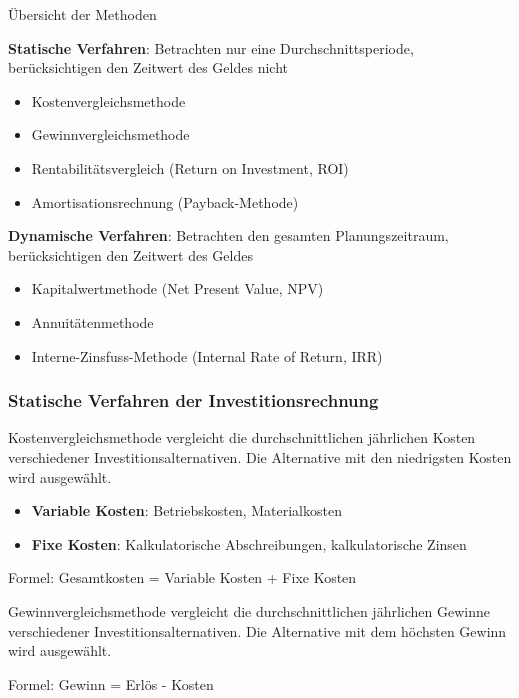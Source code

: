 \begin{definition}{Übersicht der Methoden}

    \textbf{Statische Verfahren}: Betrachten nur eine Durchschnittsperiode, berücksichtigen den Zeitwert des Geldes nicht
    \begin{itemize}
        \item Kostenvergleichsmethode
        \item Gewinnvergleichsmethode
        \item Rentabilitätsvergleich (Return on Investment, ROI)
        \item Amortisationsrechnung (Payback-Methode)
    \end{itemize}
\textbf{Dynamische Verfahren}: Betrachten den gesamten Planungszeitraum, berücksichtigen den Zeitwert des Geldes
    \begin{itemize}
        \item Kapitalwertmethode (Net Present Value, NPV)
        \item Annuitätenmethode
        \item Interne-Zinsfuss-Methode (Internal Rate of Return, IRR)
    \end{itemize}

\end{definition}

\subsubsection{Statische Verfahren der Investitionsrechnung}

\begin{definition}{Kostenvergleichsmethode}
     vergleicht die durchschnittlichen jährlichen Kosten verschiedener Investitionsalternativen. Die Alternative mit den niedrigsten Kosten wird ausgewählt.
\begin{itemize}
    \item \textbf{Variable Kosten}: Betriebskosten, Materialkosten
    \item \textbf{Fixe Kosten}: Kalkulatorische Abschreibungen, kalkulatorische Zinsen
\end{itemize}

Formel: Gesamtkosten = Variable Kosten + Fixe Kosten
\end{definition}

\begin{definition}{Gewinnvergleichsmethode}
vergleicht die durchschnittlichen jährlichen Gewinne verschiedener Investitionsalternativen. Die Alternative mit dem höchsten Gewinn wird ausgewählt.

Formel: Gewinn = Erlös - Kosten
\end{definition}

